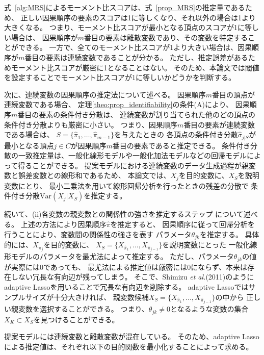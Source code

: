式~\eqref{alg:MRS}によるモーメント比スコアは、式~\eqref{prop_MRS}の推定量であるため、
正しい因果順序の要素のスコアは1に等しくなり、それ以外の場合は1より大きくなる。
つまり、モーメント比スコアが最小となる頂点のスコアが1に等しい場合は、
因果順序が$m$番目の要素は離散変数であり、その変数を特定することができる。
一方で、全てのモーメント比スコアが1より大きい場合は、因果順序が$m$番目の要素は連続変数であることが分かる。
ただし、推定誤差があるためモーメント比スコアが厳密に1となることはない。
そのため、本論文では閾値を設定することでモーメント比スコアが1に等しいかどうかを判断する。

次に、連続変数の因果順序の推定法について述べる。
因果順序$m$番目の頂点が連続変数である場合、
定理\ref{theo:prop_identifiability}の条件(A)により、
因果順序$m$番目の要素の条件付き分散は、
連続変数が割り当てられた他のどの頂点の条件付き分散よりも厳密に小さい。
つまり、因果順序$m$番目の要素が連続変数である場合は、
$S =\{\widehat{\pi}_1, \dots, \widehat{\pi}_{m-1}\}$を与えたときの
各頂点の条件付き分散$\widehat{\sigma}_{j|S}$が
最小となる頂点$j \in C$が因果順序$m$番目の要素であると推定できる。
条件付き分散の一致推定量は、一般化線形モデルや一般化加法モデルなどの回帰モデルによって得ることができる。
提案モデルにおける連続変数のデータ生成過程が親変数と誤差変数との線形和であるため、
本論文では、$X_j$を目的変数に、$X_S$を説明変数にとり、
最小二乗法を用いて線形回帰分析を行ったときの残差の分散で
条件付き分散$\mathrm{Var}(X_j|X_S)$を推定する。

続いて、(ii)各変数の親変数との関係性の強さを推定するステップ について述べる。
上述の方法により因果順序$\widehat{\pi}$を推定すると、
因果順序に従って回帰分析を行うことにより、変数間の関係性の強さを表す
パラメータ$\theta_{jk}$を推定する。
具体的には、$X_{\pi_j}$を目的変数に、
$X_S = \{ X_{\widehat{\pi}_1}, \dots, X_{\widehat{\pi}_{j-1}}\}$を説明変数にとった
一般化線形モデルのパラメータを最尤法によって推定する。
ただし、パラメータ$\theta_{jk}$の値が実際には0であっても、
最尤法による推定値は厳密には0にならず、本来は存在しない冗長な有向辺が残ってしまう。
そこで、Shimizu \textit{et al.}(2011)\cite{Shimizu2011-pd}のように
adaptive Lasso\cite{Zou2006-pi}を用いることで冗長な有向辺を削除する。
adaptive Lassoではサンプルサイズが十分大きければ、
親変数候補$X_S = \{ X_{\widehat{\pi}_1}, \dots, X_{\widehat{\pi}_{j-1}}\}$の中から
正しい親変数を選択することができる。
つまり、$\theta_{jk} \neq 0$となるような変数の集合$X_K \subset X_S$を見つけることができる。

提案モデルには連続変数と離散変数が混在している。
そのため、adaptive Lassoによる推定値は、それぞれ以下の目的関数を最小化することによって求める。

